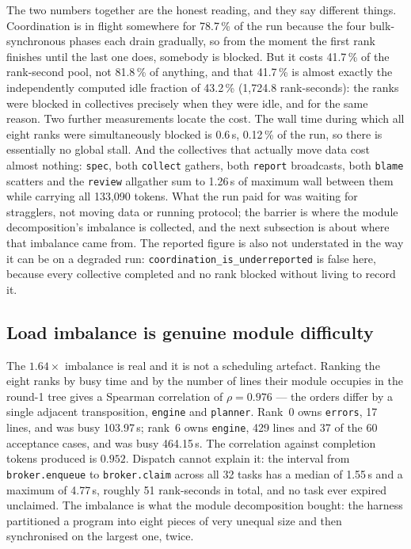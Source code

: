 \documentclass[11pt]{article}
\begin{document}
The two numbers together are the honest reading, and they say different things. Coordination is
in flight somewhere for 78.7\,\% of the run because the four bulk-synchronous phases each drain
gradually, so from the moment the first rank finishes until the last one does, somebody is
blocked. But it costs 41.7\,\% of the rank-second pool, not 81.8\,\% of anything, and that
41.7\,\% is almost exactly the independently computed idle fraction of 43.2\,\% (1{,}724.8
rank-seconds): the ranks were blocked in collectives precisely when they were idle, and for the
same reason. Two further measurements locate the cost. The wall time during which all eight
ranks were simultaneously blocked is 0.6\,s, 0.12\,\% of the run, so there is essentially no
global stall. And the collectives that actually move data cost almost nothing: \texttt{spec},
both \texttt{collect} gathers, both \texttt{report} broadcasts, both \texttt{blame} scatters
and the \texttt{review} allgather sum to 1.26\,s of maximum wall between them while carrying
all 133{,}090 tokens. What the run paid for was waiting for stragglers, not moving data or
running protocol; the barrier is where the module decomposition's imbalance is collected, and
the next subsection is about where that imbalance came from. The reported figure is also not
understated in the way it can be on a degraded run: \texttt{coordination\_is\_underreported} is
false here, because every collective completed and no rank blocked without living to record it.

\subsection*{Load imbalance is genuine module difficulty}

The $1.64\times$ imbalance is real and it is not a scheduling artefact. Ranking the eight
ranks by busy time and by the number of lines their module occupies in the round-1 tree gives
a Spearman correlation of $\rho = 0.976$ --- the orders differ by a single adjacent
transposition, \texttt{engine} and \texttt{planner}. Rank~0 owns \texttt{errors}, 17 lines,
and was busy 103.97\,s; rank~6 owns \texttt{engine}, 429 lines and 37 of the 60 acceptance
cases, and was busy 464.15\,s. The correlation against completion tokens produced is $0.952$.
Dispatch cannot explain it: the interval from \texttt{broker.enqueue} to \texttt{broker.claim}
across all 32 tasks has a median of 1.55\,s and a maximum of 4.77\,s, roughly 51 rank-seconds
in total, and no task ever expired unclaimed. The imbalance is what the module decomposition
bought: the harness partitioned a program into eight pieces of very unequal size and then
synchronised on the largest one, twice.
\end{document}
